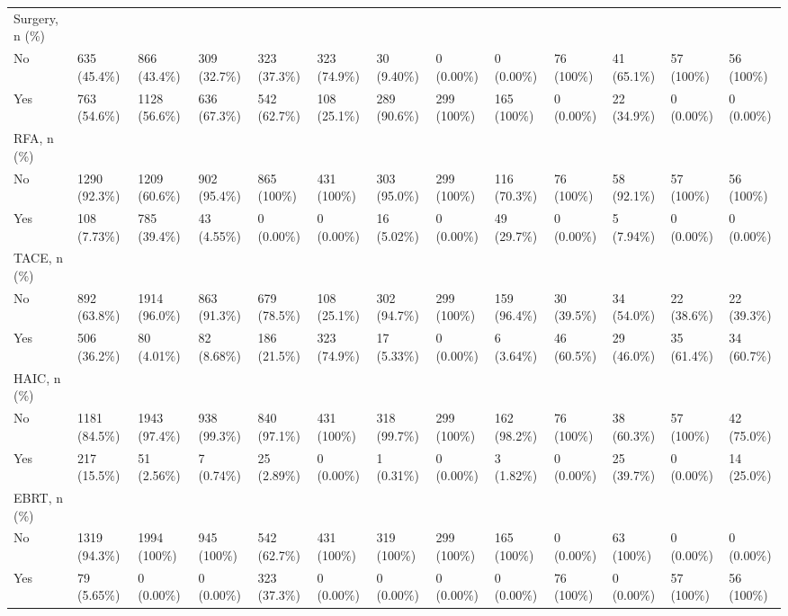 \begin{landscape}
\begin{center}
\begin{longtable}{p{5.2cm}p{3.0cm}}
Surgery, n (\%) &  &  &  &  &  &  &  &  &  &  &  &  \\
No & 635 (45.4\%) & 866 (43.4\%) & 309 (32.7\%) & 323 (37.3\%) & 323 (74.9\%) & 30 (9.40\%) & 0 (0.00\%) & 0 (0.00\%) & 76 (100\%) & 41 (65.1\%) & 57 (100\%) & 56 (100\%) \\
Yes & 763 (54.6\%) & 1128 (56.6\%) & 636 (67.3\%) & 542 (62.7\%) & 108 (25.1\%) & 289 (90.6\%) & 299 (100\%) & 165 (100\%) & 0 (0.00\%) & 22 (34.9\%) & 0 (0.00\%) & 0 (0.00\%) \\
RFA, n (\%) &  &  &  &  &  &  &  &  &  &  &  &  \\
No & 1290 (92.3\%) & 1209 (60.6\%) & 902 (95.4\%) & 865 (100\%) & 431 (100\%) & 303 (95.0\%) & 299 (100\%) & 116 (70.3\%) & 76 (100\%) & 58 (92.1\%) & 57 (100\%) & 56 (100\%) \\
Yes & 108 (7.73\%) & 785 (39.4\%) & 43 (4.55\%) & 0 (0.00\%) & 0 (0.00\%) & 16 (5.02\%) & 0 (0.00\%) & 49 (29.7\%) & 0 (0.00\%) & 5 (7.94\%) & 0 (0.00\%) & 0 (0.00\%) \\
TACE, n (\%) &  &  &  &  &  &  &  &  &  &  &  &  \\
No & 892 (63.8\%) & 1914 (96.0\%) & 863 (91.3\%) & 679 (78.5\%) & 108 (25.1\%) & 302 (94.7\%) & 299 (100\%) & 159 (96.4\%) & 30 (39.5\%) & 34 (54.0\%) & 22 (38.6\%) & 22 (39.3\%) \\
Yes & 506 (36.2\%) & 80 (4.01\%) & 82 (8.68\%) & 186 (21.5\%) & 323 (74.9\%) & 17 (5.33\%) & 0 (0.00\%) & 6 (3.64\%) & 46 (60.5\%) & 29 (46.0\%) & 35 (61.4\%) & 34 (60.7\%) \\
HAIC, n (\%) &  &  &  &  &  &  &  &  &  &  &  &  \\
No & 1181 (84.5\%) & 1943 (97.4\%) & 938 (99.3\%) & 840 (97.1\%) & 431 (100\%) & 318 (99.7\%) & 299 (100\%) & 162 (98.2\%) & 76 (100\%) & 38 (60.3\%) & 57 (100\%) & 42 (75.0\%) \\
Yes & 217 (15.5\%) & 51 (2.56\%) & 7 (0.74\%) & 25 (2.89\%) & 0 (0.00\%) & 1 (0.31\%) & 0 (0.00\%) & 3 (1.82\%) & 0 (0.00\%) & 25 (39.7\%) & 0 (0.00\%) & 14 (25.0\%) \\
EBRT, n (\%) &  &  &  &  &  &  &  &  &  &  &  &  \\
No & 1319 (94.3\%) & 1994 (100\%) & 945 (100\%) & 542 (62.7\%) & 431 (100\%) & 319 (100\%) & 299 (100\%) & 165 (100\%) & 0 (0.00\%) & 63 (100\%) & 0 (0.00\%) & 0 (0.00\%) \\
Yes & 79 (5.65\%) & 0 (0.00\%) & 0 (0.00\%) & 323 (37.3\%) & 0 (0.00\%) & 0 (0.00\%) & 0 (0.00\%) & 0 (0.00\%) & 76 (100\%) & 0 (0.00\%) & 57 (100\%) & 56 (100\%) \\

\end{longtable}
\end{center}
\end{landscape}
